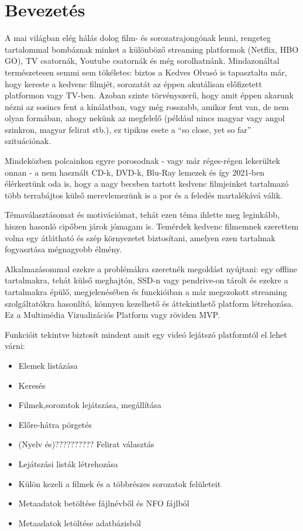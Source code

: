 \chapter{Bevezetés} %
\label{ch:intro}

A mai világban elég hálás dolog film- és sorozatrajongónak lenni, rengeteg tartalommal bombáznak minket a különböző streaming platformok (Netflix, HBO GO), TV csatornák, Youtube csatornák és még sorolhatnánk. Mindazonáltal természetesen semmi sem tökéletes: biztos a Kedves Olvasó is tapasztalta már, hogy kereste a kedvenc filmjét, sorozatát az éppen akutálisan előfizetett platformon vagy TV-ben. Azoban szinte törvényszerű, hogy amit éppen akarunk nézni az sosincs fent a kínálatban, vagy még rosszabb, amikor fent van, de nem olyan formában, ahogy nekünk az megfelelő (például nincs magyar vagy angol szinkron, magyar felirat stb.), ez tipikus esete a ``so close, yet so far'' szituációnak.

Mindeközben polcainkon egyre porosodnak - vagy már réges-régen lekerültek onnan - a nem használt CD-k, DVD-k, Blu-Ray lemezek és így 2021-ben élérkeztünk oda is, hogy a nagy becsben tartott kedvenc filmjeinket tartalmazó több terrabájtos külső merevlemezünk is a por és a feledés martalékává válik.

Témaválasztásomat és motivációmat, tehát ezen téma ihlette meg leginkább, hiszen hasonló cipőben járok jómagam is. Temérdek kedvenc filmemnek szerettem volna egy átlátható és szép környezetet biztosítani, amelyen ezen tartalmak fogyasztása mégnagyobb élmény.

Alkalmazásommal ezekre a problémákra szeretnék megoldást nyújtani: egy offline tartalmakra, tehát külső meghajtón, SSD-n vagy pendrive-on tárolt és ezekre a tartalmakra épülő, megjelenésében és funckióiban a már megszokott streaming szolgáltatókra hasonlító, könnyen kezelhető és áttekinthető platform létrehozása.\\
Ez a Multimédia Vizualizációs Platform vagy röviden MVP.

Funkcióit tekintve biztosít mindent amit egy videó lejátszó platformtól el lehet várni:
\begin{itemize}
    \item Elemek listázása
    \item Keresés
	\item Filmek,sorozatok lejátszása, megállítása
	\item Előre-hátra pörgetés
	\item (Nyelv és)?????????? Felirat választás
	\item Lejátszási listák létrehozása
	\item Külön kezeli a filmek és a többrészes sorozatok felületeit
	\item Metaadatok betöltése fájlnévből és NFO fájlból
	\item Metaadatok letöltése adatbázisból
\end{itemize}

